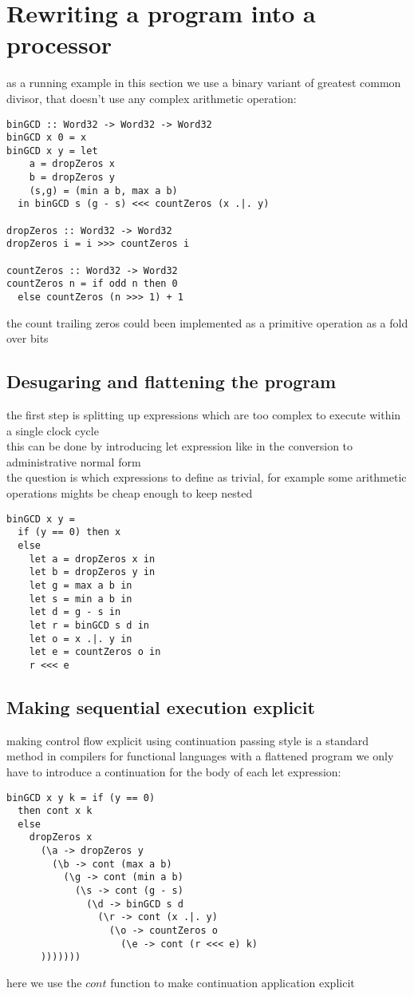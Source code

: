 \documentclass[preprint]{sigplanconf}
\begin{document}
\section{Rewriting a program into a processor}
as a running example in this section we use a binary variant of greatest common divisor, that doesn't use any complex arithmetic operation:
\begin{lstlisting}
binGCD :: Word32 -> Word32 -> Word32       
binGCD x 0 = x
binGCD x y = let
    a = dropZeros x
    b = dropZeros y
    (s,g) = (min a b, max a b)
  in binGCD s (g - s) <<< countZeros (x .|. y)

dropZeros :: Word32 -> Word32
dropZeros i = i >>> countZeros i

countZeros :: Word32 -> Word32
countZeros n = if odd n then 0 
  else countZeros (n >>> 1) + 1
\end{lstlisting}
the count trailing zeros could been implemented as a primitive operation as a fold over bits

\subsection{Desugaring and flattening the program}
the first step is splitting up expressions which are too complex to execute within a single clock cycle \\
this can be done by introducing let expression like in the conversion to administrative normal form \cite{ANF} \\
the question is which expressions to define as trivial, for example some arithmetic operations mights be cheap enough to keep nested \\
\begin{lstlisting}
binGCD x y = 
  if (y == 0) then x
  else
    let a = dropZeros x in
    let b = dropZeros y in
    let g = max a b in
    let s = min a b in
    let d = g - s in
    let r = binGCD s d in
    let o = x .|. y in
    let e = countZeros o in
    r <<< e
\end{lstlisting}

\subsection{Making sequential execution explicit}
making control flow explicit using continuation passing style is a standard method in compilers for functional languages
with a flattened program we only have to introduce a continuation for the body of each let expression:
\begin{lstlisting}
binGCD x y k = if (y == 0)
  then cont x k
  else
    dropZeros x
      (\a -> dropZeros y
        (\b -> cont (max a b)
          (\g -> cont (min a b)
            (\s -> cont (g - s)
              (\d -> binGCD s d
                (\r -> cont (x .|. y)
                  (\o -> countZeros o
                    (\e -> cont (r <<< e) k)
      )))))))
\end{lstlisting}
here we use the $cont$ function to make continuation application explicit
\end{document}
